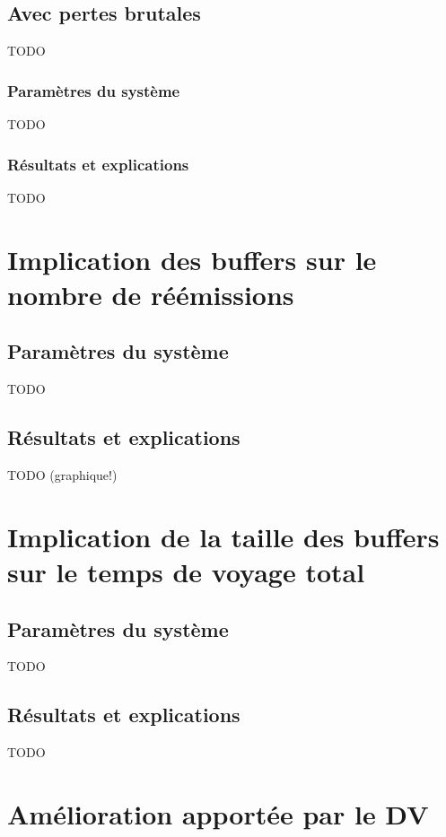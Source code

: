 \documentclass[a4paper,11pt]{article}
\begin{document}
\subsection{Avec pertes brutales}
TODO
\subsubsection{Paramètres du système}
TODO
\subsubsection{Résultats et explications}
TODO



\section{Implication des buffers sur le nombre de réémissions}
\subsection{Paramètres du système}
TODO

\subsection{Résultats et explications}
TODO (graphique!)






\section{Implication de la taille des buffers sur le temps de voyage total}
\subsection{Paramètres du système}
TODO

\subsection{Résultats et explications}
TODO









\section{Amélioration apportée par le DV}
\end{document}
